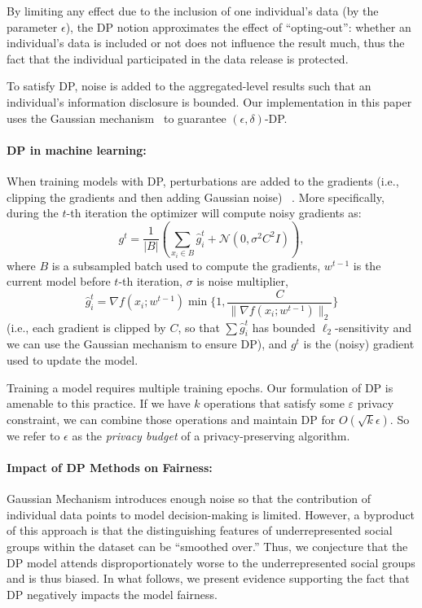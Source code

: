 \documentclass[11pt]{article} %
\begin{document}
By limiting any effect due to the inclusion of one individual's data (by the parameter $\epsilon$), the DP notion {approximates} the effect of ``opting-out'': whether an individual's data is included or not does not influence the result much, thus the fact that the individual participated in the data release is protected.

To satisfy DP, noise is added to the aggregated-level results such that an individual's information disclosure is bounded. Our implementation in this paper uses the Gaussian mechanism~\cite{dpbook} to guarantee $(\epsilon, \delta)$-DP. 


\paragraph{DP in machine learning:} When training models with DP, perturbations are added to the gradients (i.e., clipping the gradients and then adding Gaussian noise) ~\cite{abadi2016deep}.  More specifically, during the $t$-th iteration the optimizer will compute noisy gradients as: 
$$g^t = \frac{1}{|B|}(\sum_{x_i \in B}\limits \hat{g}^t_{i} +\mathcal{N}\left(0, \sigma^2 C^2 I\right)),$$
where $B$ is a subsampled batch used to compute the gradients, $w^{t-1}$ is the current model before $t$-th iteration, $\sigma$ is noise multiplier, $$\hat{g}^t_{i}=\nabla f(x_i; w^{t-1})\min \{1, \frac{C}{\|\nabla f(x_i; w^{t-1})\|_2}\}$$ (i.e., each gradient is clipped by $C$, so that $\sum\limits \hat{g}^t_{i}$ has bounded $\ell_2$-sensitivity and we can use the Gaussian mechanism to ensure DP), and $g^t$ is the (noisy) gradient used to update the model.

Training a model requires multiple training epochs. Our formulation of DP is amenable to this practice. If we have $k$ operations that satisfy some $\varepsilon$ privacy constraint, we can combine those operations and maintain DP for $O(\sqrt{k}\epsilon)$. So we refer to $\epsilon$ as the \textit{privacy budget} of a privacy-preserving algorithm.

\paragraph{Impact of DP Methods on Fairness:}
Gaussian Mechanism introduces enough noise so that the contribution of individual data points to model decision-making is limited. However, a byproduct of this approach is that the distinguishing features of underrepresented social groups within the dataset can be ``smoothed over.'' Thus, we conjecture that the DP model attends disproportionately worse to the underrepresented social groups and is thus biased. In what follows, we present evidence supporting the fact that DP negatively impacts the model fairness. 
\end{document}
